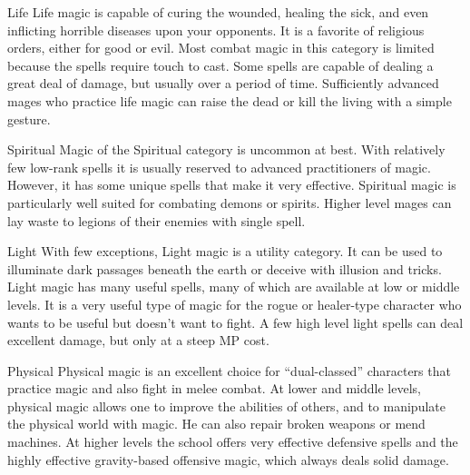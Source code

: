 \documentclass[twoside]{book}
\begin{document}
              
                  Life   Life magic is capable
                  of curing the wounded, healing the sick, and even
                  inflicting horrible diseases upon your opponents. It is
                  a favorite of religious orders, either for good or
                  evil. Most combat magic in this category is limited
                  because the spells require touch to cast. Some spells
                  are capable of dealing a great deal of damage, but
                  usually over a period of time. Sufficiently advanced
                  mages who practice life magic can raise the dead or
                  kill the living with a simple gesture.
                
              
                  Spiritual   Magic of the
                  Spiritual category is uncommon at best. With relatively
                  few low-rank spells it is usually reserved to advanced
                  practitioners of magic. However, it has some unique
                  spells that make it very effective. Spiritual magic is
                  particularly well suited for combating demons or
                  spirits. Higher level mages can lay waste to legions of
                  their enemies with single spell.
                
              
                  Light   With few exceptions,
                  Light magic is a utility category. It can be used to
                  illuminate dark passages beneath the earth or deceive
                  with illusion and tricks. Light magic has many useful
                  spells, many of which are available at low or middle
                  levels. It is a very useful type of magic for the rogue
                  or healer-type character who wants to be useful but
                  doesn’t want to fight. A few high level light
                  spells can deal excellent damage, but only at a steep
                  MP cost.
                
              
                  Physical   Physical magic is
                  an excellent choice for “dual-classed”
                  characters that practice magic and also fight in melee
                  combat. At lower and middle levels, physical magic
                  allows one to improve the abilities of others, and to
                  manipulate the physical world with magic. He can also
                  repair broken weapons or mend machines. At higher
                  levels the school offers very effective defensive
                  spells and the highly effective gravity-based offensive
                  magic, which always deals solid damage.
                
\end{document}
